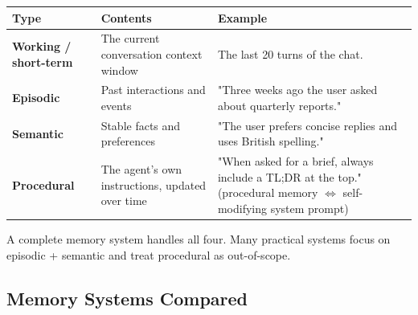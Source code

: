 \documentclass[a4paper,11pt]{article}
\begin{document}
\begin{center}\small
\begin{tabular}{p{3cm} p{4.5cm} p{5.5cm}}
  \toprule
  \textbf{Type} & \textbf{Contents} & \textbf{Example} \\
  \midrule
  \textbf{Working / short-term} &
    The current conversation context window &
    The last 20 turns of the chat. \\
  \addlinespace
  \textbf{Episodic} &
    Past interactions and events &
    "Three weeks ago the user asked about quarterly reports." \\
  \addlinespace
  \textbf{Semantic} &
    Stable facts and preferences &
    "The user prefers concise replies and uses British spelling." \\
  \addlinespace
  \textbf{Procedural} &
    The agent's own instructions, updated over time &
    "When asked for a brief, always include a TL;DR at the top."
        (procedural memory $\Leftrightarrow$ self-modifying system
        prompt) \\
  \bottomrule
\end{tabular}
\end{center}

A complete memory system handles all four. Many practical systems
focus on episodic + semantic and treat procedural as out-of-scope.

\subsection{Memory Systems Compared}
\end{document}
